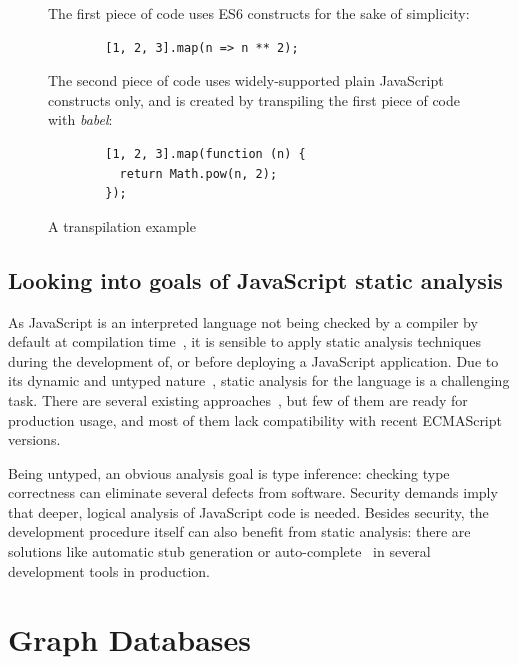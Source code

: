 \vspace{1em}
\begin{figure}[!htb]
	\centering
	\begin{minipage}{25em}
		The first piece of code uses ES6 constructs for the sake of simplicity:

		\begin{verbatim}
		[1, 2, 3].map(n => n ** 2);
		\end{verbatim}

		The second piece of code uses widely-supported plain JavaScript constructs only, and is created by transpiling the first piece of code with \emph{babel}:

		\begin{verbatim}
		[1, 2, 3].map(function (n) {
		  return Math.pow(n, 2);
		});
		\end{verbatim}
	\end{minipage}
  \caption{A transpilation example}
  \label{fig:transpiling-example}
\end{figure}


\subsection{Looking into goals of JavaScript static analysis}

As JavaScript is an interpreted language not being checked by a compiler by default at compilation time~\cite{373902}, it is sensible to apply static analysis techniques during the development of, or before deploying a JavaScript application. Due to its dynamic and untyped nature~\cite{flanagan2006javascript}, static analysis for the language is a challenging task. There are several existing approaches~\cite{madsen2013practical, livshits2010gulfstream, jensen2009type}, but few of them are ready for production usage, and most of them lack compatibility with recent ECMAScript versions.

Being untyped, an obvious analysis goal is type inference: checking type correctness can eliminate several defects from software. Security demands imply that deeper, logical analysis of JavaScript code is needed. Besides security, the development procedure itself can also benefit from static analysis: there are solutions like automatic stub generation or auto-complete~\cite{madsen2013practical} in several development tools in production.~\cite{esprima-autocomplete, webstorm-autocomplete}


\section{Graph Databases}

